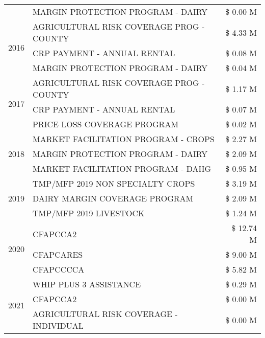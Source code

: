 \begin{tabular}{llr}
 & MARGIN PROTECTION PROGRAM - DAIRY & \$ 0.00 M \\
\cline{1-3}
\multirow[t]{3}{*}{2016} & AGRICULTURAL RISK COVERAGE PROG - COUNTY & \$ 4.33 M \\
 & CRP PAYMENT - ANNUAL RENTAL & \$ 0.08 M \\
 & MARGIN PROTECTION PROGRAM - DAIRY & \$ 0.04 M \\
\cline{1-3}
\multirow[t]{3}{*}{2017} & AGRICULTURAL RISK COVERAGE PROG - COUNTY & \$ 1.17 M \\
 & CRP PAYMENT - ANNUAL RENTAL & \$ 0.07 M \\
 & PRICE LOSS COVERAGE PROGRAM & \$ 0.02 M \\
\cline{1-3}
\multirow[t]{3}{*}{2018} & MARKET FACILITATION PROGRAM - CROPS & \$ 2.27 M \\
 & MARGIN PROTECTION PROGRAM - DAIRY & \$ 2.09 M \\
 & MARKET FACILITATION PROGRAM - DAHG & \$ 0.95 M \\
\cline{1-3}
\multirow[t]{3}{*}{2019} & TMP/MFP 2019 NON SPECIALTY CROPS & \$ 3.19 M \\
 & DAIRY MARGIN COVERAGE PROGRAM & \$ 2.09 M \\
 & TMP/MFP 2019 LIVESTOCK & \$ 1.24 M \\
\cline{1-3}
\multirow[t]{3}{*}{2020} & CFAPCCA2 & \$ 12.74 M \\
 & CFAPCARES & \$ 9.00 M \\
 & CFAPCCCCA & \$ 5.82 M \\
\cline{1-3}
\multirow[t]{3}{*}{2021} & WHIP PLUS 3 ASSISTANCE & \$ 0.29 M \\
 & CFAPCCA2 & \$ 0.00 M \\
 & AGRICULTURAL RISK COVERAGE - INDIVIDUAL & \$ 0.00 M \\
\cline{1-3}
\bottomrule
\end{tabular}
